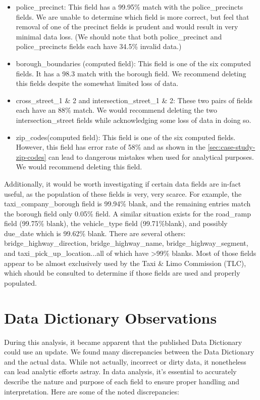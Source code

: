 \documentclass[12pt, titlepage]{article}
\begin{document}
{\begin{itemize}
		    \item police\_precinct: This field has a 99.95\% match with the police\_precincts fields. We are unable to determine which
		    field is more correct, but feel that removal of one of the precinct fields is prudent and would result in very minimal 
		    data loss. (We should note that both police\_precinct and police\_precincts fields each have 34.5\% invalid data.)
		   
		   \item borough\_boundaries (computed field): This field is one of the six computed fields. It has a 98.3 match with the
		    borough field. We recommend deleting this fields despite the somewhat limited loss of data. 
		    
		    \item cross\_street\_1 \& 2 and intersection\_street\_1 \& 2: These two pairs of fields each have an 88\% match. We would
		    recommend deleting the two intersection\_street fields while acknowledging some loss of data in doing so.
		     
		    \item zip\_codes(computed field):  This field is one of the six computed fields.  However, this field has error rate of
		    58\% and as shown in the \ref{sec:case-study-zip-codes} can lead to dangerous mistakes when used for analytical purposes.
		    We would recommend deleting this field.
	\end{itemize}
 	
Additionally, it would be worth investigating if certain data fields are in-fact useful, as the population of these fields is very, very 
scarce. For example, the taxi\_company\_borough field is 99.94\% blank, and the remaining entries match the borough field only
0.05\% field. A similar situation exists for the road\_ramp field (99.75\% blank), the vehicle\_type field (99.71\%blank), and possibly 
due\_date which is 99.62\% blank. There are several others: bridge\_highway\_direction, bridge\_highway\_name,
bridge\_highway\_segment, and taxi\_pick\_up\_location...all of which have \textgreater99\% blanks. Most of those fields appear to be 
almost exclusively used by the Taxi \& Limo Commission (TLC), which should be consulted to 
determine if those fields are used and properly populated.   



\section{Data Dictionary Observations} \label{sec:datadictionay}
During this analysis, it became apparent that the published Data Dictionary could use an update. We found many discrepancies between
the Data Dictionary and the actual data. While not actually, incorrect or dirty data, it nonetheless can lead analytic efforts astray.
In data analysis, it's essential to accurately describe the nature and purpose of each field to ensure proper handling and interpretation. 
Here are some of the noted discrepancies:  

}
\end{document}
